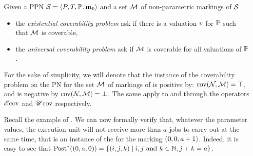 \begin{defi}
  Given a \ac{PPN} $\defPPN$ and a set $\mathcal{M}$ of non-parametric markings of $\mathcal{S}_{{}}$
  \begin{itemize}
    \item the \emph{existential coverability problem} ask if there is a valuation $\val$ for $\mathbb{P}$ such that $\mathcal{M}$ is coverable,
    \item the \emph{universal   coverability problem} ask if $\mathcal{M}$ is coverable for all valuations of $\mathbb{P}$.
  \end{itemize}
\end{defi}

For the sake of simplicity, we will denote that the instance of the coverability problem on the \ac{PN} \namePN for the set $\mathcal{M}$ of markings of \namePN is positive by: $\operatorname{cov}(\mathcal{N}_{}, \mathcal{M}) = \top$, and is negative by $\operatorname{cov}(\mathcal{N}_{}, \mathcal{M}) = \bot$. The same apply to \Ecov and \Ucov through the operators $\operatorname{\mathscr{E}cov}$ and $\operatorname{\mathscr{U}cov}$ respectively.

\label{label:mutex-example-analyse}
Recall the example of .
We can now formally verify that, whatever the parameter values, the execution unit will not receive more than $a$ jobs to carry out at the same time, that is an instance of the \Ecov for the marking $(0, 0, \param[1]+1)$.
Indeed, it is easy to see that $\Post^*((0, \param[1], 0)) = \setComp{(i, j, k)}{i, j \text{ and } k \in \naturals, j + k = \param[1]}$.

